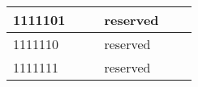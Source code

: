 \documentclass[architecture]{compas2018}
\begin{document}
\begin{table}[!h]
\begin{center}
\begin{tabular}{|l|l|l|l|l|c|}
    \hline
    1111101 & \texttt{}       &                               & reserved                                             &      &             \\
    \hline
    1111110 & \texttt{}       &                               & reserved                                             &      &             \\
    \hline
    1111111 & \texttt{}       &                               & reserved                                             &      &             \\
    \hline
  \end{tabular}
\end{center}
\end{table}
\end{document}
